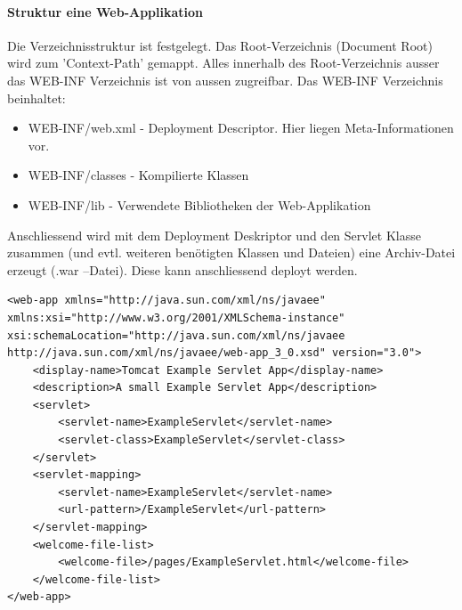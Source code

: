 \paragraph{Struktur eine Web-Applikation}
Die Verzeichnisstruktur ist festgelegt. Das Root-Verzeichnis (Document Root) wird zum 'Context-Path' gemappt. Alles innerhalb des Root-Verzeichnis ausser das WEB-INF Verzeichnis ist von aussen zugreifbar. Das WEB-INF Verzeichnis beinhaltet:
\begin{itemize}
	\item WEB-INF/web.xml - Deployment Descriptor. Hier liegen Meta-Informationen vor.
	\item WEB-INF/classes - Kompilierte Klassen
	\item WEB-INF/lib - Verwendete Bibliotheken der Web-Applikation
\end{itemize}

Anschliessend wird mit dem Deployment Deskriptor und den Servlet Klasse zusammen (und evtl. weiteren benötigten Klassen und Dateien) eine Archiv-Datei erzeugt (.war –Datei). Diese kann anschliessend deployt werden.

\begin{lstlisting}[caption=web.xml Sample]
<web-app xmlns="http://java.sun.com/xml/ns/javaee" xmlns:xsi="http://www.w3.org/2001/XMLSchema-instance" xsi:schemaLocation="http://java.sun.com/xml/ns/javaee http://java.sun.com/xml/ns/javaee/web-app_3_0.xsd" version="3.0">
	<display-name>Tomcat Example Servlet App</display-name>
	<description>A small Example Servlet App</description>
	<servlet>
		<servlet-name>ExampleServlet</servlet-name>
		<servlet-class>ExampleServlet</servlet-class>
	</servlet>
	<servlet-mapping>
		<servlet-name>ExampleServlet</servlet-name>
		<url-pattern>/ExampleServlet</url-pattern>
	</servlet-mapping>
	<welcome-file-list>
		<welcome-file>/pages/ExampleServlet.html</welcome-file>
	</welcome-file-list>
</web-app>
\end{lstlisting}




